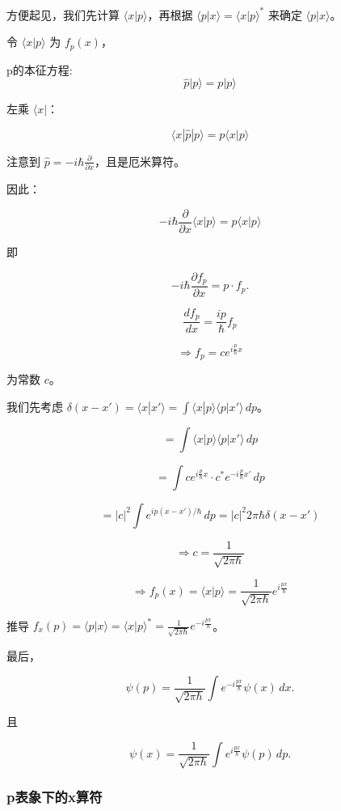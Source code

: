 \documentclass[lang=cn,10pt]{elegantbook}
\begin{document}
方便起见，我们先计算 $\langle x | p \rangle$，再根据 $\langle p | x \rangle = \langle x | p \rangle^*$ 来确定 $\langle p | x \rangle$。

令 $\langle x | p \rangle$ 为 $f_p(x)$，


	p的本征方程:
	\[
	\hat{p} | p \rangle = p | p \rangle
\]

左乘 $\langle x |$：

\[
\langle x | \hat{p} | p \rangle = p \langle x | p \rangle
\]

注意到 $\hat{p} = -i\hbar \frac{\partial}{\partial x}$，且是厄米算符。

因此：

\[
-i\hbar \frac{\partial}{\partial x} \langle x | p \rangle = p \langle x | p \rangle
\]

即 

\[
	-i\hbar \frac{\partial f_p}{\partial x}= p \cdot f_p.
\]

\[
	\frac{df_p}{dx} = \frac{ip}{\hbar} f_p
\]

\[
	\Rightarrow f_p = c e^{i \frac{p}{\hbar} x}
\]

为常数 $c$。

	我们先考虑 $\delta(x - x') = \langle x | x' \rangle = \int \langle x | p \rangle \langle p | x' \rangle \, dp$。

\[
	= \int \langle x | p \rangle \langle p | x' \rangle \, dp
\]

\[
	= \int c e^{i \frac{p}{\hbar} x} \cdot c^* e^{-i \frac{p}{\hbar} x'} \, dp
\]

\[
	= |c|^2 \int e^{i p (x - x')/\hbar} \, dp=|c|^2 2\pi\hbar\delta(x-x')
\]

\[
\Rightarrow c = \frac{1}{\sqrt{2\pi \hbar}}
\]

\[
\Rightarrow f_p(x) = \langle x | p \rangle = \frac{1}{\sqrt{2\pi \hbar}} e^{i \frac{p x}{\hbar}}
\]

推导 $f_x(p) = \langle p | x \rangle = \langle x | p \rangle^* = \frac{1}{\sqrt{2\pi \hbar}} e^{-i \frac{p x}{\hbar}}$。

最后，

\[
\psi(p) = \frac{1}{\sqrt{2\pi \hbar}} \int e^{-i \frac{p x}{\hbar}} \psi(x) \, dx.
\]

且

\[
\psi(x) = \frac{1}{\sqrt{2\pi \hbar}} \int e^{i \frac{p x}{\hbar}} \psi(p) \, dp.
\]

\subsubsection{p表象下的x算符}
\end{document}
